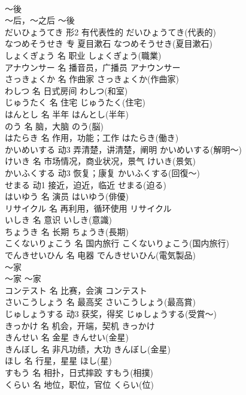 \documentclass[8pt]{extreport}
\begin{document}
\begin{CJK}{UTF8}{min}
\\	～後	
\\	～后，～之后	～後	
\\	だいひょうてき	形2	有代表性的	だいひょうてき(代表的)	
\\	なつめそうせき	专	夏目漱石	なつめそうせき(夏目漱石)	
\\	しょくぎょう	名	职业	しょくぎょう(職業)	
\\	アナウンサー	名	播音员，广播员	アナウンサー	
\\	さっきょくか	名	作曲家	さっきょくか(作曲家)	
\\	わしつ	名	日式房间	わしつ(和室)	
\\	じゅうたく	名	住宅	じゅうたく(住宅)	
\\	はんとし	名	半年	はんとし(半年)	
\\	のう	名	脑，大脑	のう(脳)	
\\	はたらき	名	作用，功能；工作	はたらき(働き)	
\\	かいめいする	动3	弄清楚，讲清楚，阐明	かいめいする(解明～)	
\\	けいき	名	市场情况，商业状况，景气	けいき(景気)	
\\	かいふくする	动3	恢复；康复	かいふくする(回復～)	
\\	せまる	动1	接近，迫近，临近	せまる(迫る)	
\\	はいゆう	名	演员	はいゆう(俳優)	
\\	リサイクル	名	再利用，循环使用	リサイクル	
\\	いしき	名	意识	いしき(意識)	
\\	ちょうき	名	长期	ちょうき(長期)	
\\	こくないりょこう	名	国内旅行	こくないりょこう(国内旅行)	
\\	でんきせいひん	名	电器	でんきせいひん(電気製品)	
\\	～家	
\\	～家	～家	
\\	コンテスト	名	比赛，会演	コンテスト	
\\	さいこうしょう	名	最高奖	さいこうしょう(最高賞)	
\\	じゅしょうする	动3	获奖，得奖	じゅしょうする(受賞～)	
\\	きっかけ	名	机会，开端，契机	きっかけ	
\\	きんせい	名	金星	きんせい(金星)	
\\	きんぼし	名	非凡功绩，大功	きんぼし(金星)	
\\	ほし	名	行星，星星	ほし(星)	
\\	すもう	名	相扑，日式摔跤	すもう(相撲)	
\\	くらい	名	地位，职位，官位	くらい(位)	

\end{CJK}
\end{document}
